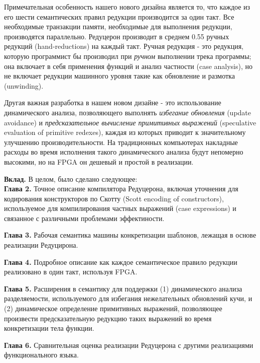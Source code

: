 \documentclass[flenqn, 14pt]{extarticle}
\begin{document}
Примечательная особенность нашего нового дизайна является то, что каждое из его шести семантических правил редукции производится за один такт. Все необходимые транзакции памяти, необходимые для выполнения редукции, производятся параллельно. Редуцерон производит в среднем 0.55 ручных редукций (hand-reductions) на каждый такт. Ручная редукция - это редукция, которую программист бы производил при \textit{ручном} выполнении трека программы; она включает в себя применения функций и анализ частности (case analysis), но не включает редукции машинного уровня такие как обновление и размотка (unwinding). 

Другая важная разработка в нашем новом дизайне - это использование динамического анализа, позволяющего выполнять \textit{избегание обновления} (update avoidance) и \textit{предсказательное вычисление примитивных выражений} (speculative evaluation of primitive redexes), каждая из которых приводит к значительному улучшению производительности. На традиционных компьютерах накладные расходы во время исполнения такого динамического анализа будут непомерно высокими, но на FPGA он дешевый и простой в реализации.

\textbf{Вклад.} В целом, было сделано следующее: \\
\textbf{Глава 2.} Точное описание компилятора Редуцерона, включая уточнения для кодирования конструкторов по Скотту (Scott encoding of constructors), используемое для компилирования частных выражений (case expressions) и связанное с различными проблемами эффектиности.

\textbf{Глава 3.} Рабочая семантика машины конкретизации шаблонов, лежащая в основе реализации Редуцирона.

\textbf{Глава 4.} Подробное описание как каждое семантическое правило редукции реализовано в один такт, используя FPGA.

\textbf{Глава 5.} Расширения в семантику для поддержки (1) динамического анализа разделяемости, используемого для избегания нежелательных обновлений кучи, и (2) динамическое определение примитивных выражений, позволяющее произвести предсказательную редукцию таких выражений во время конкретизации тела функции. 

\textbf{Глава 6.} Сравнительная оценка реализации Редуцерона с другими реализациями функционального языка.
\end{document}
